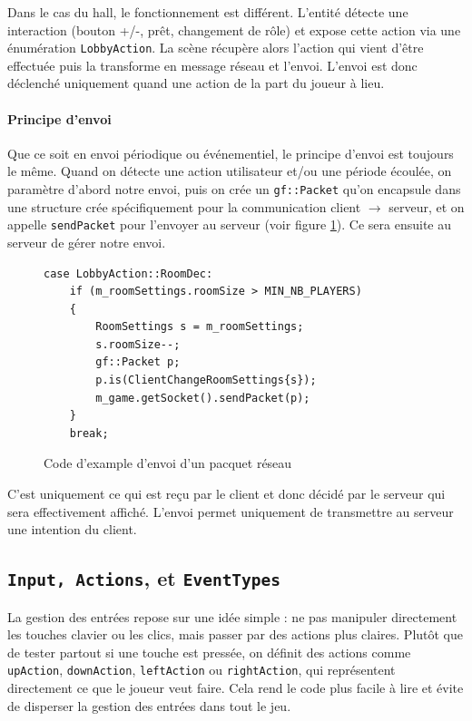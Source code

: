 \documentclass[a4paper, 11pt]{article}
\begin{document}
Dans le cas du hall, le fonctionnement est différent.
L’entité détecte une interaction (bouton +/-, prêt, changement de rôle) 
et expose cette action via une énumération \texttt{LobbyAction}.
La scène récupère alors l'action qui vient d'être effectuée puis la transforme en message réseau et l'envoi.
L'envoi est donc déclenché uniquement quand une action de la part du joueur à lieu.

\paragraph{Principe d'envoi}

Que ce soit en envoi périodique ou événementiel, le principe d'envoi est toujours le même. 
Quand on détecte une action utilisateur et/ou une période écoulée, on paramètre d'abord notre envoi, puis on crée un \texttt{gf::Packet} qu'on encapsule dans une structure crée spécifiquement pour la communication client $\rightarrow$ serveur,
et on appelle \texttt{sendPacket} pour l'envoyer au serveur (voir figure \ref{fig:code_envoi}). 
Ce sera ensuite au serveur de gérer notre envoi.

\vspace{0.3cm}

\begin{figure}[H]
\begin{lstlisting}[xleftmargin=.075\textwidth, xrightmargin=.075\textwidth]
case LobbyAction::RoomDec:
    if (m_roomSettings.roomSize > MIN_NB_PLAYERS)
    {
        RoomSettings s = m_roomSettings;
        s.roomSize--;
        gf::Packet p;
        p.is(ClientChangeRoomSettings{s});
        m_game.getSocket().sendPacket(p);
    }
    break;
\end{lstlisting}
\caption{Code d'example d'envoi d'un pacquet réseau}
\label{fig:code_envoi}
\end{figure}

C'est uniquement ce qui est reçu par le client et donc décidé par le serveur qui sera effectivement affiché.
L'envoi permet uniquement de transmettre au serveur une intention du client.

\subsection{\texttt{Input, Actions}, et \texttt{EventTypes}}

La gestion des entrées repose sur une idée simple : ne pas manipuler directement les touches clavier ou les clics, mais passer par des actions plus claires. 
Plutôt que de tester partout si une touche est pressée, on définit des actions comme \texttt{upAction}, \texttt{downAction}, \texttt{leftAction} ou \texttt{rightAction}, qui représentent directement ce que le joueur veut faire. 
Cela rend le code plus facile à lire et évite de disperser la gestion des entrées dans tout le jeu.
\end{document}
